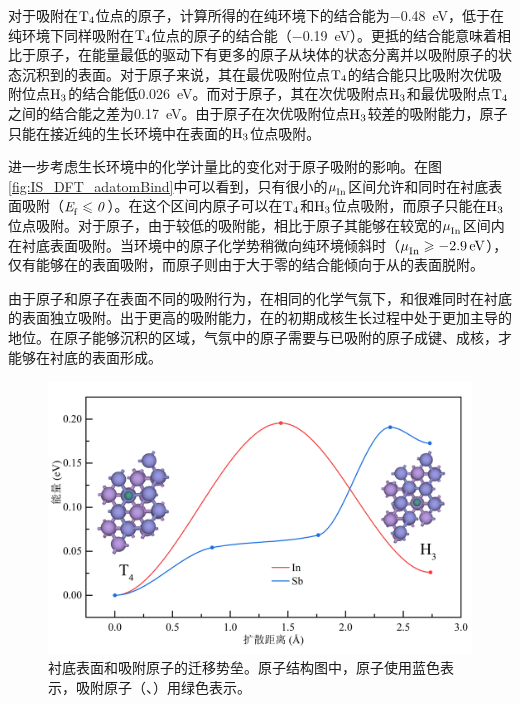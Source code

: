 对于吸附在$\rm T_{4} \it$位点的原子，计算所得的在纯环境下的结合能为\SI{-0.48}{\electronvolt}，低于在纯环境下同样吸附在$\rm T_{4} \it$位点的原子的结合能（\SI{-0.19}{\electronvolt}）。更抵的结合能意味着相比于原子，在能量最低的驱动下有更多的原子从块体的状态分离并以吸附原子的状态沉积到的表面。对于原子来说，其在最优吸附位点$\rm T_{4} \it$的结合能只比吸附次优吸附位点$\rm H_{3} \it$的结合能低\SI{0.026}{\electronvolt}。而对于原子，其在次优吸附点$\rm H_{3} \it$和最优吸附点$\rm T_{4} \it$之间的结合能之差为\SI{0.17}{\electronvolt}。由于原子在次优吸附位点$\rm H_{3} \it$较差的吸附能力，原子只能在接近纯的生长环境中在表面的$\rm H_{3} \it$位点吸附。

进一步考虑生长环境中的化学计量比的变化对于原子吸附的影响。在图\ref{fig:IS_DFT_adatomBind}中可以看到，只有很小的$\it \mu_{\rm In}^{\rm } \it$区间允许和同时在衬底表面吸附（$\it E_{\rm f}^{\rm } \it \leqslant 0$）。在这个区间内原子可以在$\rm T_{4} \it$和$\rm H_{3} \it$位点吸附，而原子只能在$\rm H_{3} \it$位点吸附。对于原子，由于较低的吸附能，相比于原子其能够在较宽的$\it \mu_{\rm In}^{\rm } \it$区间内在衬底表面吸附。当环境中的原子化学势稍微向纯环境倾斜时（$\it \mu_{\rm In}^{\rm } \it\geqslant \SI{-2.9}{\electronvolt}$），仅有能够在的表面吸附，而原子则由于大于零的结合能倾向于从的表面脱附。

由于原子和原子在表面不同的吸附行为，在相同的化学气氛下，和很难同时在衬底的表面独立吸附。出于更高的吸附能力，在的初期成核生长过程中处于更加主导的地位。在原子能够沉积的区域，气氛中的原子需要与已吸附的原子成键、成核，才能够在衬底的表面形成。

\begin{figure}[htb]
    \includegraphics{pic/IS_DFT_adatomDiff.png}
    \caption{衬底表面和吸附原子的迁移势垒。原子结构图中，原子使用蓝色表示，吸附原子（、）用绿色表示。}
    \label{fig:IS_DFT_adatomDiff}
\end{figure}


